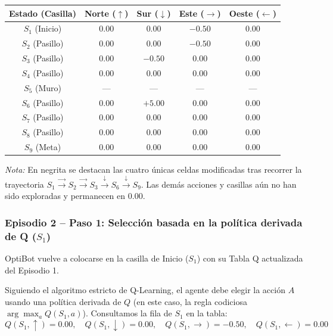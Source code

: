 \begin{calculomanual}
\begin{center}
\small
\begin{tabular}{ccccc}
  \toprule
  \textbf{Estado (Casilla)} & \textbf{Norte ($\uparrow$)} & \textbf{Sur ($\downarrow$)} & \textbf{Este ($\rightarrow$)} & \textbf{Oeste ($\leftarrow$)} \\
  \midrule
  $S_1$ (Inicio)  & $0.00$ & $0.00$          & $\mathbf{-0.50}$ & $0.00$ \\
  $S_2$ (Pasillo) & $0.00$ & $0.00$          & $\mathbf{-0.50}$ & $0.00$ \\
  $S_3$ (Pasillo) & $0.00$ & $\mathbf{-0.50}$ & $0.00$          & $0.00$ \\
  $S_4$ (Pasillo) & $0.00$ & $0.00$          & $0.00$          & $0.00$ \\
  $S_5$ (Muro)    & ---    & ---             & ---             & ---    \\
  $S_6$ (Pasillo) & $0.00$ & $\mathbf{+5.00}$ & $0.00$          & $0.00$ \\
  $S_7$ (Pasillo) & $0.00$ & $0.00$          & $0.00$          & $0.00$ \\
  $S_8$ (Pasillo) & $0.00$ & $0.00$          & $0.00$          & $0.00$ \\
  $S_9$ (Meta)    & $0.00$ & $0.00$          & $0.00$          & $0.00$ \\
  \bottomrule
\end{tabular}
\end{center}
\textit{Nota:} En negrita se destacan las cuatro únicas celdas modificadas tras recorrer la trayectoria $S_1 \xrightarrow{\rightarrow} S_2 \xrightarrow{\rightarrow} S_3 \xrightarrow{\downarrow} S_6 \xrightarrow{\downarrow} S_9$. Las demás acciones y casillas aún no han sido exploradas y permanecen en $0.00$.

\subsubsection*{Episodio 2 -- Paso 1: Selección basada en la política derivada de Q ($S_1$)}
OptiBot vuelve a colocarse en la casilla de Inicio ($S_1$) con su Tabla Q actualizada del Episodio 1. 

Siguiendo el algoritmo estricto de Q-Learning, el agente debe elegir la acción $A$ usando una política derivada de $Q$ (en este caso, la regla codiciosa $\arg\max_a Q(S_1, a)$). Consultamos la fila de $S_1$ en la tabla:
\[
  Q(S_1, \uparrow) = 0.00, \quad Q(S_1, \downarrow) = 0.00, \quad Q(S_1, \rightarrow) = \mathbf{-0.50}, \quad Q(S_1, \leftarrow) = 0.00
\]


\end{calculomanual}
